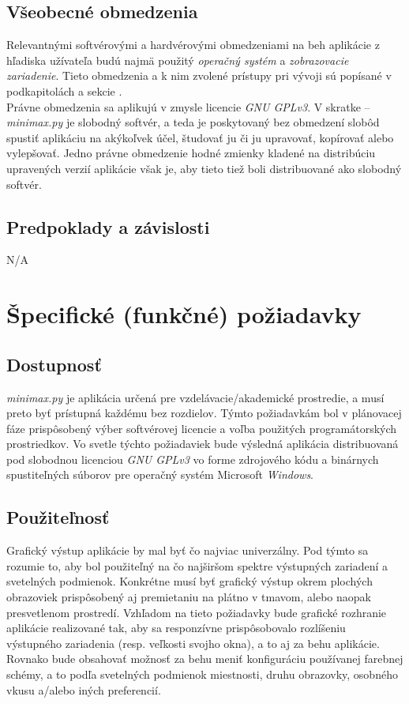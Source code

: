 \documentclass{article}
\begin{document}
\subsection{Všeobecné obmedzenia}\label{subsec:constraints}
Relevantnými softvérovými a hardvérovými obmedzeniami na beh aplikácie z hľadiska užívateľa budú najmä použitý \emph{operačný systém} a \emph{zobrazovacie zariadenie}. Tieto obmedzenia a k nim zvolené prístupy pri vývoji sú popísané v podkapitolách  a  sekcie .\\
Právne obmedzenia sa aplikujú v zmysle licencie \emph{GNU GPLv3}. V skratke – \emph{minimax.py} je slobodný softvér, a teda je poskytovaný bez obmedzení slobôd spustiť aplikáciu na akýkoľvek účel, študovať ju či ju upravovať, kopírovať alebo vylepšovať. Jedno právne obmedzenie hodné zmienky kladené na distribúciu upravených verzií aplikácie však je, aby tieto tiež boli distribuované ako slobodný softvér.

\subsection{Predpoklady a závislosti}\label{subsec:premise}
N/A
\newpage

\section{Špecifické (funkčné) požiadavky}\label{sec:specific}
\subsection{Dostupnosť}\label{subsec:availability}
\emph{minimax.py} je aplikácia určená pre vzdelávacie/akademické prostredie, a musí preto byť prístupná každému bez rozdielov. Týmto požiadavkám bol v plánovacej fáze prispôsobený výber softvérovej licencie a voľba použitých programátorských prostriedkov.
Vo svetle týchto požiadaviek bude výsledná aplikácia distribuovaná pod slobodnou licenciou \emph{GNU GPLv3} vo forme zdrojového kódu a binárnych spustiteľných súborov pre operačný systém Microsoft \emph{Windows}.

\subsection{Použiteľnosť}\label{subsec:usability}
Grafický výstup aplikácie by mal byť čo najviac univerzálny. Pod týmto sa rozumie to, aby bol použiteľný na čo najširšom spektre výstupných zariadení a svetelných podmienok. Konkrétne musí byť grafický výstup okrem plochých obrazoviek prispôsobený aj premietaniu na plátno v tmavom, alebo naopak presvetlenom prostredí.
Vzhľadom na tieto požiadavky bude grafické rozhranie aplikácie realizované tak, aby sa responzívne prispôsobovalo rozlíšeniu výstupného zariadenia (resp. veľkosti svojho okna), a to aj za behu aplikácie.
Rovnako bude obsahovať možnosť za behu meniť konfiguráciu používanej farebnej schémy, a to podľa svetelných podmienok miestnosti, druhu obrazovky, osobného vkusu a/alebo iných preferencií.
\end{document}
